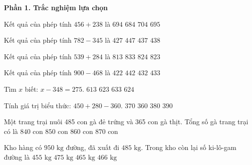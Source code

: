 \textbf{Phần 1. Trắc nghiệm lựa chọn}

\begin{ex} %
Kết quả của phép tính $456 + 238$ là
\choice
{\True $694$}
{$684$}
{$704$}
{$695$}
\end{ex}

\begin{ex} %
Kết quả của phép tính $782 - 345$ là
\choice
{$427$}
{$447$}
{\True $437$}
{$438$}
\end{ex}

\begin{ex} %
Kết quả của phép tính $539 + 284$ là
\choice
{$813$}
{$833$}
{$824$}
{\True $823$}
\end{ex}

\begin{ex} %
Kết quả của phép tính $900 - 468$ là
\choice
{$422$}
{$442$}
{\True $432$}
{$433$}
\end{ex}

\begin{ex} %
Tìm $x$ biết: $x - 348 = 275$.
\choice
{$613$}
{\True $623$}
{$633$}
{$624$}
\end{ex}

\begin{ex} %
Tính giá trị biểu thức: $450 + 280 - 360$.
\choice
{\True $370$}
{$360$}
{$380$}
{$390$}
\end{ex}

\begin{ex} %
Một trang trại nuôi 485 con gà đẻ trứng và 365 con gà thịt. Tổng số gà trang trại có là
\choice
{$840$ con}
{\True $850$ con}
{$860$ con}
{$870$ con}
\end{ex}

\begin{ex} %
Kho hàng có $950\text{ kg}$ đường, đã xuất đi $485\text{ kg}$. Trong kho còn lại số ki-lô-gam đường là
\choice
{$455\text{ kg}$}
{$475\text{ kg}$}
{\True $465\text{ kg}$}
{$466\text{ kg}$}
\end{ex}

